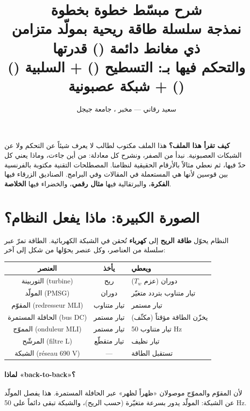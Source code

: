 \documentclass[11pt,a4paper]{article}
\title{\textbf{شرح مبسّط خطوة بخطوة}\\[3mm]
\large نمذجة سلسلة طاقة ريحية بمولّد متزامن ذي مغانط دائمة (\fr{PMSG}) قدرتها \fr{2 MW}\\
والتحكم فيها بـ: التسطيح (\fr{platitude}) + السلبية (\fr{passivité}) + شبكة عصبونية (\fr{ANN})}
\author{سعيد رقاني — مخبر \fr{L2EI}، جامعة جيجل}
\date{}
\newcommand{\fr}[1]{\textfrench{#1}}
\begin{document}
\maketitle

\begin{fikra}
\textbf{كيف تقرأ هذا الملف؟}
هذا الملف مكتوب لطالب لا يعرف شيئاً عن التحكم ولا عن الشبكات العصبونية. نبدأ من الصفر، ونشرح كل
معادلة: من أين جاءت، وماذا يعني كل حدّ فيها، ثم نعطي مثالاً بالأرقام الحقيقية لنظامنا.
المصطلحات التقنية مكتوبة بالفرنسية بين قوسين لأنها هي المستعملة في المقالات وفي البرامج.
الصناديق الزرقاء فيها \textbf{الفكرة}، والبرتقالية فيها \textbf{مثال رقمي}، والخضراء فيها \textbf{الخلاصة}.
\end{fikra}

\tableofcontents
\newpage

\section{الصورة الكبيرة: ماذا يفعل النظام؟}

النظام يحوّل \textbf{طاقة الريح} إلى \textbf{كهرباء} تُحقن في الشبكة الكهربائية. الطاقة تمرّ عبر سلسلة
من العناصر، وكل عنصر يحوّلها من شكل إلى آخر:

\begin{center}
\begin{tabular}{ccl}
\toprule
العنصر & يأخذ & ويعطي\\
\midrule
التوربينة (\fr{turbine}) & ريح & دوران (عزم \fr{$T_w$})\\
المولّد (\fr{PMSG}) & دوران & تيار متناوب بتردد متغيّر\\
المقوّم (\fr{redresseur MLI}) & تيار متناوب & تيار مستمر\\
الحافلة المستمرة (\fr{bus DC}) & تيار مستمر & يخزّن الطاقة مؤقتاً (مكثّف)\\
المموّج (\fr{onduleur MLI}) & تيار مستمر & تيار متناوب \fr{50 Hz}\\
المرشّح (\fr{filtre L}) & تيار متقطّع & تيار نظيف\\
الشبكة (\fr{réseau 690 V}) & --- & تستقبل الطاقة\\
\bottomrule
\end{tabular}
\end{center}

\paragraph{لماذا «\fr{back-to-back}»؟}
لأن المقوّم والمموّج موصولان «ظهراً لظهر» عبر الحافلة المستمرة. هذا يفصل المولّد عن الشبكة:
المولّد يدور بسرعة متغيّرة (حسب الريح)، والشبكة تبقى دائماً على \fr{50 Hz}.
\end{document}
